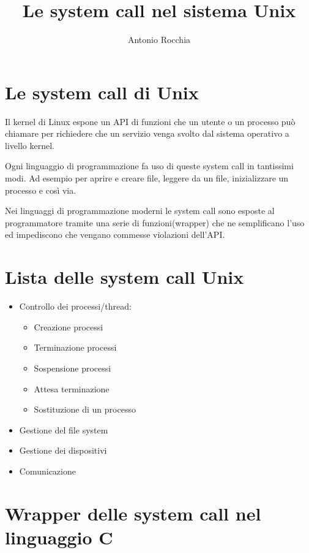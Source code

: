 \documentclass
[10pt,        %
 a4paper,     %
 onecolumn,   %
 fleqn,       %
 twoside,     %
 notitlepage, %
 openany      %
]{article}    %
\title{Le system call nel sistema Unix}
\author{Antonio Rocchia}
\begin{document}
\maketitle          
\tableofcontents %

\section{Le system call di Unix}
Il kernel di Linux espone un API di funzioni che un utente o un processo può chiamare per richiedere che un servizio venga svolto dal sistema operativo a livello kernel.

Ogni linguaggio di programmazione fa uso di queste system call in tantissimi modi. Ad esempio per aprire e creare file, leggere da un file, inizializzare un processo e così via.

Nei linguaggi di programmazione moderni le system call sono esposte al programmatore tramite una serie di funzioni(wrapper) che ne semplificano l'uso ed impediscono che vengano commesse violazioni dell'API.
\section{Lista delle system call Unix}
\begin{itemize}
    \item Controllo dei processi/thread:
        \begin{itemize}
            \item Creazione processi
            \item Terminazione processi
            \item Sospensione processi
            \item Attesa terminazione
            \item Sostituzione di un processo
        \end{itemize}
    \item Gestione del file system
    \item Gestione dei dispositivi
    \item Comunicazione
\end{itemize}

\section{Wrapper delle system call nel linguaggio C}
\end{document}
